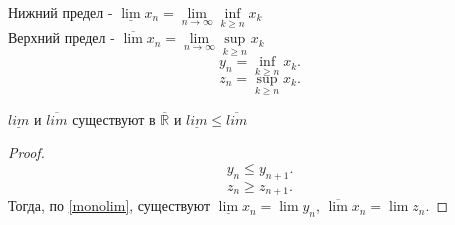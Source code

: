 \documentclass[11pt, oneside]{article}   	%
\begin{document}
    \begin{definition}
        Нижний предел - $\underline{\lim} x_n = \lim\limits_{n \to \infty} \inf\limits_{k\ge n} x_k$ \\
        Верхний предел - $\overline{\lim} x_n = \lim\limits_{n \to \infty} \sup\limits_{k\ge n} x_k $ \\
        \[ y_n =\inf\limits_{k\ge n}x_k .\]
        \[ z_n = \sup\limits_{k\ge n}x_k .\]
    \end{definition}
    \begin{theorem}
        $\underline{lim}$ и  $\overline{lim}$ существуют в $\overline{\mathbb{R}}$ и $\underline{lim} \le \overline{lim}$ 
        \begin{proof}
            \[ y_n \le y_{n+1} .\]
            \[ z_{n} \ge z_{n+1} .\]
            Тогда, по \ref{monolim}, существуют $\underline{\lim}x_n = \lim y_n$,  $\overline{\lim}x_n = \lim z_n$.
        \end{proof}
        
    \end{theorem}
\end{document}
